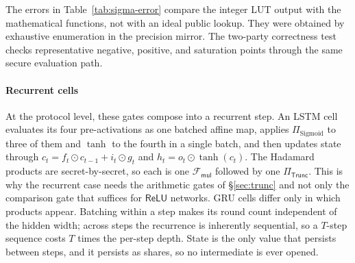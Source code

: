 \documentclass[journal]{IEEEtran}
\theoremstyle{definition}
\theoremstyle{plain}
\newcommand{\Fmul}{\mathcal{F}_{\mathsf{mul}}}
\newcommand{\ReLU}{\mathsf{ReLU}}
\newcommand{\Trunc}{\Pi_{\mathsf{Trunc}}}
\begin{document}
\begin{table}[t]
\centering
\caption{Measured error of the SIGMA-based sigmoid and the derived tanh at
$q=10$ and
$f=12$. The input scan covers every representable value in $[-16,16)$;
ULP is $2^{-12}$ at the output.}
\label{tab:sigma-error}
\end{table}
The errors in Table~\ref{tab:sigma-error} compare the integer LUT output with
the mathematical functions, not with an ideal public lookup. They were obtained
by exhaustive enumeration in the precision mirror. The two-party correctness
test checks representative negative, positive, and saturation points through the
same secure evaluation path.

\paragraph*{Recurrent cells}
At the protocol level, these gates compose into a recurrent step. An LSTM
cell evaluates its four pre-activations as one batched affine map, applies
$\Pi_{\text{Sigmoid}}$ to three of them and $\tanh$ to the fourth in a single
batch, and then updates state through
$c_t=f_t\odot c_{t-1}+i_t\odot g_t$ and $h_t=o_t\odot\tanh(c_t)$. The
Hadamard products are secret-by-secret, so each is one $\Fmul$ followed by one
$\Trunc$. This is why the recurrent case needs the arithmetic gates of
\S\ref{sec:trunc} and not only the comparison gate that suffices for $\ReLU$
networks. GRU cells differ only in which products appear. Batching within a step
makes its round count independent of the hidden width; across steps the
recurrence is inherently sequential, so a $T$-step sequence costs $T$ times the
per-step depth. State is the only value that persists between steps, and it
persists as shares, so no intermediate is ever opened.
\end{document}
